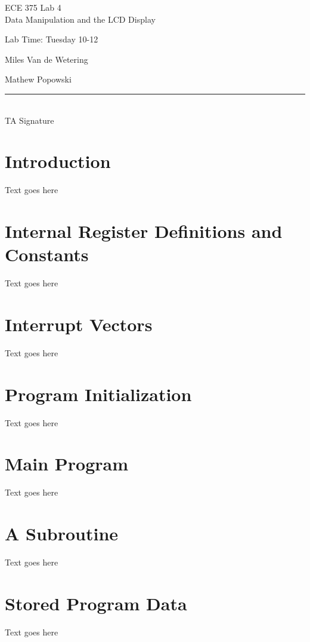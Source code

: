 \documentclass[12pt,letterpaper]{article}
\begin{document}
\begin{titlepage}
    \vspace*{4cm}
    \begin{flushright}
    {\huge
        ECE 375 Lab 4\\[1cm]
    }
    {\large
        Data Manipulation and the LCD Display
    }
    \end{flushright}
    \begin{flushleft}
    Lab Time: Tuesday 10-12
    \end{flushleft}
    \begin{flushright}
    Miles Van de Wetering

	Mathew Popowski
    \vfill
    \rule{5in}{.5mm}\\
    TA Signature
    \end{flushright}

\end{titlepage}

\section{Introduction}
Text goes here

\section{Internal Register Definitions and Constants}
Text goes here

\section{Interrupt Vectors}
Text goes here

\section{Program Initialization}
Text goes here

\section{Main Program}
Text goes here

\section{A Subroutine}
Text goes here

\section{Stored Program Data}
Text goes here
\end{document}
